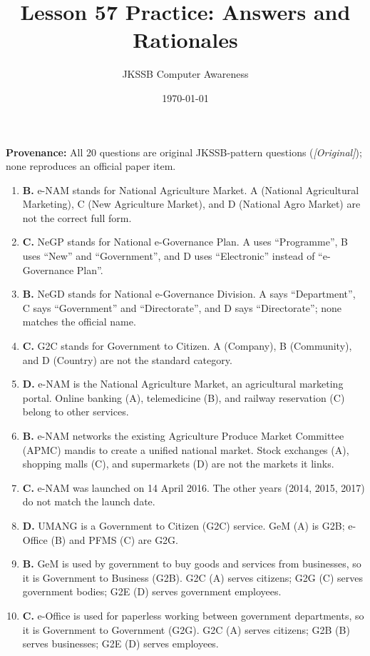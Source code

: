 \documentclass[11pt]{article}
\title{Lesson 57 Practice: Answers and Rationales}
\author{JKSSB Computer Awareness}
\date{\today}
\begin{document}
\maketitle
\noindent\textbf{Provenance:} All 20 questions are original JKSSB-pattern
questions (\textit{[Original]}); none reproduces an official paper item.
\begin{enumerate}[label=\textbf{Q\arabic*.}, leftmargin=*]
\item \textbf{B.} e-NAM stands for National Agriculture Market. A (National
  Agricultural Marketing), C (New Agriculture Market), and D (National Agro
  Market) are not the correct full form.
\item \textbf{C.} NeGP stands for National e-Governance Plan. A uses
  ``Programme'', B uses ``New'' and ``Government'', and D uses
  ``Electronic'' instead of ``e-Governance Plan''.
\item \textbf{B.} NeGD stands for National e-Governance Division. A says
  ``Department'', C says ``Government'' and ``Directorate'', and D says
  ``Directorate''; none matches the official name.
\item \textbf{C.} G2C stands for Government to Citizen. A (Company), B
  (Community), and D (Country) are not the standard category.
\item \textbf{D.} e-NAM is the National Agriculture Market, an agricultural
  marketing portal. Online banking (A), telemedicine (B), and railway
  reservation (C) belong to other services.
\item \textbf{B.} e-NAM networks the existing Agriculture Produce Market
  Committee (APMC) mandis to create a unified national market. Stock
  exchanges (A), shopping malls (C), and supermarkets (D) are not the
  markets it links.
\item \textbf{C.} e-NAM was launched on 14 April 2016. The other years (2014,
  2015, 2017) do not match the launch date.
\item \textbf{D.} UMANG is a Government to Citizen (G2C) service. GeM (A) is
  G2B; e-Office (B) and PFMS (C) are G2G.
\item \textbf{B.} GeM is used by government to buy goods and services from
  businesses, so it is Government to Business (G2B). G2C (A) serves citizens;
  G2G (C) serves government bodies; G2E (D) serves government employees.
\item \textbf{C.} e-Office is used for paperless working between government
  departments, so it is Government to Government (G2G). G2C (A) serves
  citizens; G2B (B) serves businesses; G2E (D) serves employees.

\end{enumerate}
\end{document}
